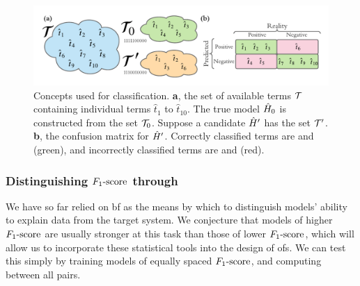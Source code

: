 \begin{figure}
    \begin{center}
        \includegraphics[width=\textwidth]{theoretical_study/figures/classication_example.pdf}
    \end{center}
    \caption[Classification concepts]{
        Concepts used for classification. 
        \textbf{a}, the set of available terms ${ \mathcal{T} }$ containing individual terms $\hat{t}_1$ to $\hat{t}_{10}$. 
        The true model $\hat{H}_0$ is constructed from the set ${ \mathcal{T} }_0$. 
        Suppose a candidate $\hat{H}^{\prime}$ has the set ${ \mathcal{T} }^{\prime}$. 
        \textbf{b}, the confusion matrix for $\hat{H}^{\prime}$. Correctly classified terms are  and  (green), 
            and incorrectly classified terms are  and  (red). 
    }
    \label{fig:classification_eg}
\end{figure}



\subsubsection{Distinguishing $ F_{1}\text{-score} $ through }\label{sec:bf_by_f_score}
We have so far relied on \gls{bf} as the means by which to distinguish models' 
    ability to explain data from the target system. 
We conjecture that models of higher $ F_{1}\text{-score} $ are usually stronger at this task than those of 
    lower $ F_{1}\text{-score} $, which will allow us to incorporate these statistical tools into the design of \glspl{of}. 
We can test this simply by training models of equally spaced $ F_{1}\text{-score} $, and computing  between all pairs.
\par 

